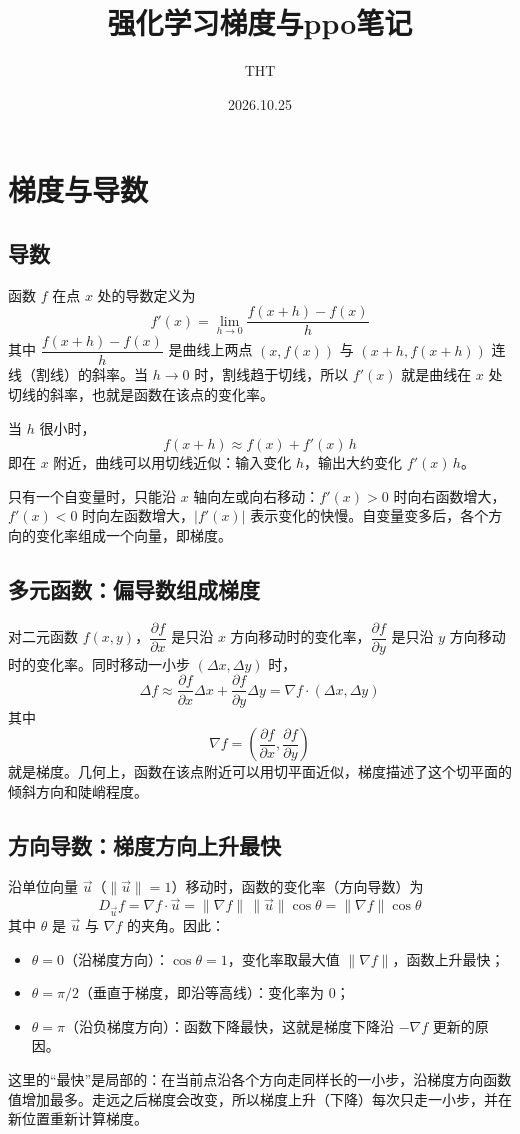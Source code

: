 \documentclass[UTF8,fontset=fandol]{ctexart}
\title{强化学习梯度与ppo笔记}
\author{THT}
\date{2026.10.25}
\begin{document}
\maketitlecolored

\section{梯度与导数}

\subsection{导数}

函数 $f$ 在点 $x$ 处的导数定义为
\[
f'(x)=\lim_{h\to 0}\frac{f(x+h)-f(x)}{h}
\]
其中 $\dfrac{f(x+h)-f(x)}{h}$ 是曲线上两点 $(x,f(x))$ 与 $(x+h,f(x+h))$ 连线（割线）的斜率。当 $h\to 0$ 时，割线趋于切线，所以 $f'(x)$ 就是曲线在 $x$ 处切线的斜率，也就是函数在该点的变化率。

当 $h$ 很小时，
\[
f(x+h)\approx f(x)+f'(x)\,h
\]
即在 $x$ 附近，曲线可以用切线近似：输入变化 $h$，输出大约变化 $f'(x)\,h$。

只有一个自变量时，只能沿 $x$ 轴向左或向右移动：$f'(x)>0$ 时向右函数增大，$f'(x)<0$ 时向左函数增大，$|f'(x)|$ 表示变化的快慢。自变量变多后，各个方向的变化率组成一个向量，即梯度。

\subsection{多元函数：偏导数组成梯度}

对二元函数 $f(x,y)$，$\dfrac{\partial f}{\partial x}$ 是只沿 $x$ 方向移动时的变化率，$\dfrac{\partial f}{\partial y}$ 是只沿 $y$ 方向移动时的变化率。同时移动一小步 $(\Delta x,\Delta y)$ 时，
\[
\Delta f\approx\frac{\partial f}{\partial x}\Delta x+\frac{\partial f}{\partial y}\Delta y=\nabla f\cdot(\Delta x,\Delta y)
\]
其中
\[
\nabla f=\left(\frac{\partial f}{\partial x},\frac{\partial f}{\partial y}\right)
\]
就是梯度。几何上，函数在该点附近可以用切平面近似，梯度描述了这个切平面的倾斜方向和陡峭程度。

\subsection{方向导数：梯度方向上升最快}

沿单位向量 $\vec{u}$（$\|\vec{u}\|=1$）移动时，函数的变化率（方向导数）为
\[
D_{\vec{u}}f=\nabla f\cdot\vec{u}=\|\nabla f\|\,\|\vec{u}\|\cos\theta=\|\nabla f\|\cos\theta
\]
其中 $\theta$ 是 $\vec{u}$ 与 $\nabla f$ 的夹角。因此：
\begin{itemize}
  \item $\theta=0$（沿梯度方向）：$\cos\theta=1$，变化率取最大值 $\|\nabla f\|$，函数上升最快；
  \item $\theta=\pi/2$（垂直于梯度，即沿等高线）：变化率为 $0$；
  \item $\theta=\pi$（沿负梯度方向）：函数下降最快，这就是梯度下降沿 $-\nabla f$ 更新的原因。
\end{itemize}
这里的“最快”是局部的：在当前点沿各个方向走同样长的一小步，沿梯度方向函数值增加最多。走远之后梯度会改变，所以梯度上升（下降）每次只走一小步，并在新位置重新计算梯度。
\end{document}
